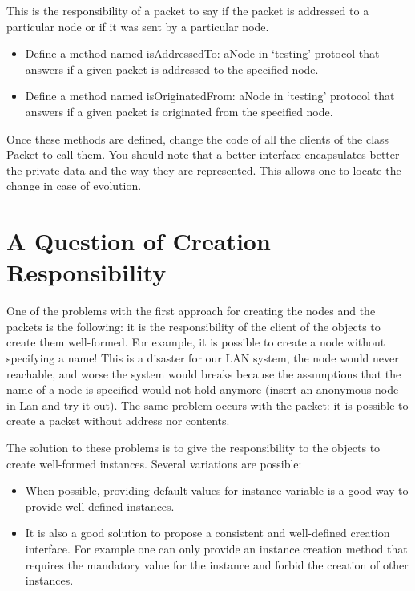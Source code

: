 This is the responsibility of a packet to say if the packet is 
addressed to a particular node or if it was sent by a particular 
node.

\begin{itemize}
\item Define a method named isAddressedTo: aNode in `testing' protocol 
that answers if a given packet is addressed to the specified 
node. 
\item Define a method named isOriginatedFrom: aNode in `testing' protocol 
that answers if a given packet is originated from the specified 
node. 
\end{itemize}


Once these methods are defined, change the code of all the clients 
of the class Packet to call them. You should note that a better 
interface encapsulates better the private data and the way they 
are represented. This allows one to locate the change in case 
of evolution.



\section{A Question of Creation Responsibility}


One of the problems with the first approach for creating the 
nodes and the packets is the following: it is the responsibility 
of the client of the objects to create them well-formed. For 
example, it is possible to create a node without specifying a 
name! This is a disaster for our LAN system, the node would never 
reachable, and worse the system would breaks because the assumptions 
that the name of a node is specified would not hold anymore (insert 
an anonymous node in Lan and try it out). The same problem occurs 
with the packet: it is possible to create a packet without address 
nor contents.

The solution to these problems is to give the responsibility 
to the objects to create well-formed instances. Several variations 
are possible:

\begin{itemize}
\item
When possible, providing default values for instance variable 
is a good way to provide well-defined instances.
\item
It is also a good solution to propose a consistent and well-defined 
creation interface. For example one can only provide an instance 
creation method that requires the mandatory value for the instance 
and forbid the creation of other instances.
\end{itemize}

